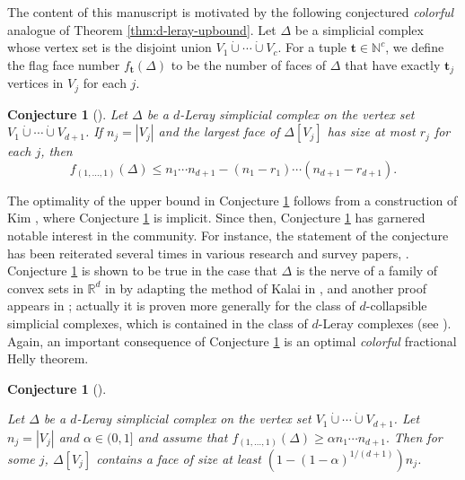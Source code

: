 \documentclass[a4paper, 10pt, reqno, english, ones]{amsart}  %
\newtheorem{conjecture}[theorem]{Conjecture}
\theoremstyle{definition}
\theoremstyle{remark}
\begin{document}
The content of this manuscript is motivated by the following conjectured \textit{colorful} analogue of Theorem \ref{thm:d-leray-upbound}. Let $\Delta$ be a simplicial complex whose vertex set is the disjoint union $V_1\dot{\cup}\cdots\dot{\cup}V_c$. For a tuple $\mathbf{t}\in \mathbb{N}^c$, we define the flag face number $f_{\mathbf{t}}(\Delta)$ to be the number of faces of $\Delta$ that have exactly $\mathbf{t}_j$ vertices in $V_j$ for each $j$.

\begin{conjecture}[\cite{Bulavka2021Optimal}]\label{conj:Upper Main}
    Let $\Delta$ be a $d$-Leray simplicial complex on the vertex set $V_1\dot{\cup}\cdots \dot{\cup} V_{d+1}$. If $n_j=|V_j|$ and the largest face of $\Delta[V_j]$ has size at most $r_j$ for each $j$, then
    \[
    f_{(1,\dots,1)}(\Delta) \leq n_1\cdots n_{d+1} - (n_1-r_1)\cdots (n_{d+1}-r_{d+1}).
    \]
\end{conjecture}

The optimality of the upper bound in Conjecture \ref{conj:Upper Main} follows from a construction of Kim \cite{kim2017note}, where Conjecture \ref{conj:Upper Main} is implicit. Since then, Conjecture \ref{conj:Upper Main} has garnered notable interest in the community. For instance, the statement of the conjecture has been reiterated several times in various research and survey papers, \cite{barany2022helly,patak2026hellytype,Bulavka2021Optimal,chakraborti2026colorful}. Conjecture \ref{conj:Upper Main} is shown to be true in the case that $\Delta$ is the nerve of a family of convex sets in $\mathbb{R}^d$ in \cite{Bulavka2021Optimal} by adapting the method of Kalai in \cite{kalai1984intersection}, and another proof appears in \cite{chakraborti2026colorful}; actually it is proven more generally for the class of $d$-collapsible simplicial complexes, which is contained in the class of $d$-Leray complexes (see \cite{martin2013intersection}). Again, an important consequence of Conjecture \ref{conj:Upper Main} is an optimal \textit{colorful} fractional Helly theorem.

\begin{conjecture}[\cite{Bulavka2021Optimal}]\label{conj:col frac helly}

Let $\Delta$ be a $d$-Leray simplicial complex on the vertex set $V_1\dot{\cup}\cdots \dot{\cup} V_{d+1}$. Let $n_j=|V_j|$ and $\alpha \in (0,1]$ and assume that $f_{(1,\dots,1)}(\Delta) \geq \alpha n_1\cdots n_{d+1}.$ Then for some $j$, $\Delta[V_j]$ contains a face of size at least $(1-(1-\alpha)^{1/(d+1)})n_j$.
    
\end{conjecture}
\end{document}
